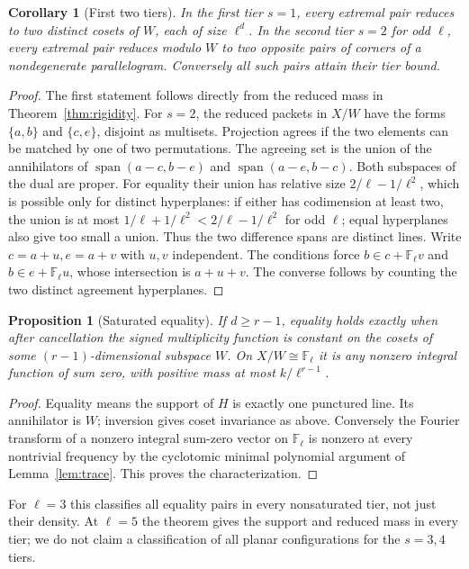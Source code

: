 \documentclass[11pt]{article}
\newtheorem{corollary}[theorem]{Corollary}
\newtheorem{proposition}[theorem]{Proposition}
\theoremstyle{remark}\newtheorem{remark}[theorem]{Remark}
\newcommand{\F}{\mathbb F}
\begin{document}
\begin{corollary}[First two tiers]\label{cor:class}
In the first tier $s=1$, every extremal pair reduces to two distinct cosets of $W$, each of size $\ell^d$. In the second tier $s=2$ for odd $\ell$, every extremal pair reduces modulo $W$ to two opposite pairs of corners of a nondegenerate parallelogram. Conversely all such pairs attain their tier bound.
\end{corollary}
\begin{proof}
The first statement follows directly from the reduced mass in Theorem~\ref{thm:rigidity}. For $s=2$, the reduced packets in $X/W$ have the forms $\{a,b\}$ and $\{c,e\}$, disjoint as multisets. Projection agrees if the two elements can be matched by one of two permutations. The agreeing set is the union of the annihilators of $\operatorname{span}(a-c,b-e)$ and $\operatorname{span}(a-e,b-c)$. Both subspaces of the dual are proper. For equality their union has relative size $2/\ell-1/\ell^2$, which is possible only for distinct hyperplanes: if either has codimension at least two, the union is at most $1/\ell+1/\ell^2<2/\ell-1/\ell^2$ for odd $\ell$; equal hyperplanes also give too small a union. Thus the two difference spans are distinct lines. Write $c=a+u,e=a+v$ with $u,v$ independent. The conditions force $b\in c+\F_\ell v$ and $b\in e+\F_\ell u$, whose intersection is $a+u+v$. The converse follows by counting the two distinct agreement hyperplanes.
\end{proof}

\begin{proposition}[Saturated equality]\label{prop:saturated}
If $d\ge r-1$, equality holds exactly when after cancellation the signed multiplicity function is constant on the cosets of some $(r-1)$-dimensional subspace $W$. On $X/W\cong\F_\ell$ it is any nonzero integral function of sum zero, with positive mass at most $k/\ell^{r-1}$.
\end{proposition}
\begin{proof}
Equality means the support of $H$ is exactly one punctured line. Its annihilator is $W$; inversion gives coset invariance as above. Conversely the Fourier transform of a nonzero integral sum-zero vector on $\F_\ell$ is nonzero at every nontrivial frequency by the cyclotomic minimal polynomial argument of Lemma~\ref{lem:trace}. This proves the characterization.
\end{proof}

For $\ell=3$ this classifies all equality pairs in every nonsaturated tier, not just their density. At $\ell=5$ the theorem gives the support and reduced mass in every tier; we do not claim a classification of all planar configurations for the $s=3,4$ tiers.
\end{document}
